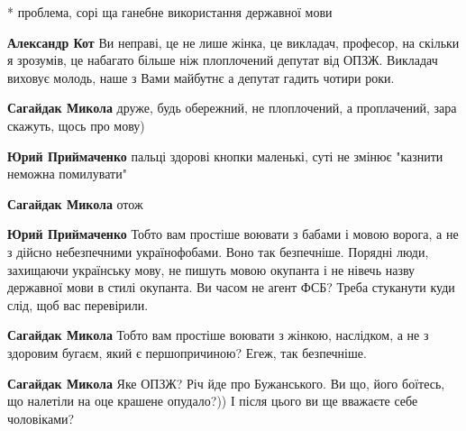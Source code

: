 \begin{itemize}
\begin{itemize}
* проблема, сорі ща ганебне використання державної мови


\textbf{Александр Кот} Ви неправі, це не лише жінка, це викладач, професор, на скільки я зрозумів, це набагато більше ніж плоплочений депутат від ОПЗЖ. Викладач виховує молодь, наше з Вами майбутнє а депутат гадить чотири роки.


\textbf{Сагайдак Микола} друже, будь обережний, не плоплочений, а проплачений, зара скажуть, щось про мову)


\textbf{Юрий Приймаченко} пальці здорові кнопки маленькі, суті не змінює "казнити неможна помилувати"


\textbf{Сагайдак Микола} отож


\textbf{Юрий Приймаченко} Тобто вам простіше воювати з бабами і мовою ворога, а не з дійсно небезпечними українофобами. Воно так безпечніше. Порядні люди, захищаючи українську мову, не пишуть мовою окупанта і не нівечь назву державної мови в стилі окупанта. Ви часом не агент ФСБ? Треба стуканути куди слід, щоб вас перевірили.


\textbf{Сагайдак Микола} Тобто вам простіше воювати з жінкою, наслідком, а не з здоровим бугаєм, який є першопричиною? Егеж, так безпечніше.


\textbf{Сагайдак Микола} Яке ОПЗЖ? Річ йде про Бужанського. Ви що, його боїтесь, що налетіли на оце крашене опудало?)) І після цього ви ще вважаєте себе чоловіками?


\end{itemize}
\end{itemize}
